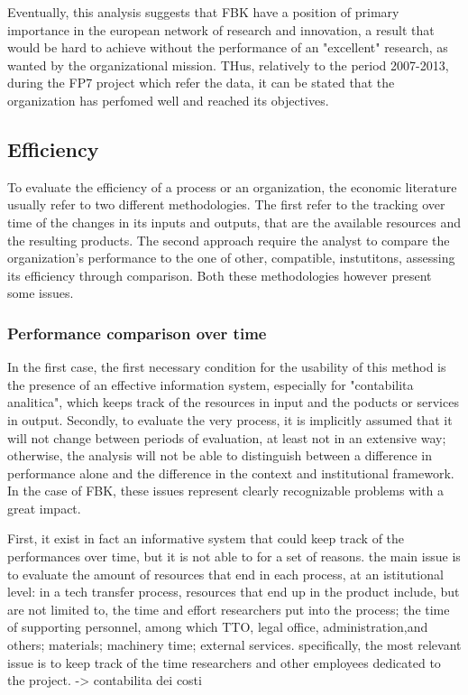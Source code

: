 Eventually, this analysis suggests that FBK have a position of primary importance in the european network of research and innovation, a result that would be hard to achieve without the performance of an "excellent" research, as wanted by the organizational mission. THus, relatively to the period 2007-2013, during the FP7 project which refer the data, it can be stated that the organization has perfomed well and reached its objectives. 

\subsection{Efficiency}

To evaluate the efficiency of a process or an organization, the economic literature usually refer to two different methodologies. The first refer to the tracking over time of the changes in its inputs and outputs, that are the available resources and the resulting products. The second approach require the analyst to compare the organization's performance to the one of other, compatible, instutitons, assessing its efficiency through comparison. Both these methodologies however present some issues.

\subsubsection{Performance comparison over time}

In the first case, the first necessary condition for the usability of this method is the presence of an effective information system, especially for "contabilita analitica", which keeps track of the resources in input and the poducts or services in output. Secondly, to evaluate the very process, it is implicitly assumed that it will not change between periods of evaluation, at least not in an extensive way; otherwise, the analysis will not be able to distinguish between a difference in performance alone and the difference in the context and institutional framework. In the case of FBK, these issues represent clearly recognizable problems with a great impact. 

First, it exist in fact an informative system that could keep track of the performances over time, but it is not able to for a set of reasons. the main issue is to evaluate the amount of resources that end in each process, at an istitutional level: in a tech transfer process, resources that end up in the product include, but are not limited to, the time and effort researchers put into the process; the time of supporting personnel, among which TTO, legal office, administration,and others; materials; machinery time; external services. specifically, the most relevant issue is to keep track of the time researchers and other employees dedicated to the project. -> contabilita dei costi

